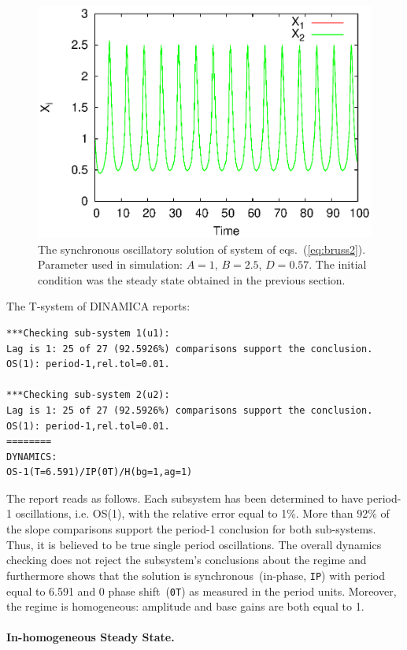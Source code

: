 \documentclass[11pt,a4paper]{article}
\begin{document}
\begin{figure}[h]
  \centering
  \includegraphics[scale=0.65]{br2_hos}
  \caption{The synchronous oscillatory solution of system of
    eqs.~(\ref{eq:bruss2}). Parameter used in simulation: $A=1$, $B=2.5$,
    $D=0.57$. The initial condition was the steady state obtained in the
    previous section.}
  \label{fig:br2_hos}
\end{figure}

The T-system of DINAMICA reports:
\begin{verbatim}
***Checking sub-system 1(u1):
Lag is 1: 25 of 27 (92.5926%) comparisons support the conclusion.
OS(1): period-1,rel.tol=0.01.

***Checking sub-system 2(u2):
Lag is 1: 25 of 27 (92.5926%) comparisons support the conclusion.
OS(1): period-1,rel.tol=0.01.
========
DYNAMICS:
OS-1(T=6.591)/IP(0T)/H(bg=1,ag=1)
\end{verbatim}

The report reads as follows. Each subsystem has been determined to have period-1
oscillations, i.e. OS(1), with the relative error equal to 1\%. More than 92\% of the
slope comparisons support the period-1 conclusion for both sub-systems. Thus, it is
believed to be true single period oscillations. The overall dynamics checking does
not reject the subsystem's conclusions about the regime and furthermore shows that
the solution is synchronous~(in-phase, \texttt{IP}) with period equal to 6.591 and 0
phase shift~(\texttt{0T}) as measured in the period units. Moreover, the regime is
homogeneous: amplitude and base gains are both equal to 1.

\paragraph{In-homogeneous Steady State.}
\label{sec:homog-steady-state}
\end{document}
